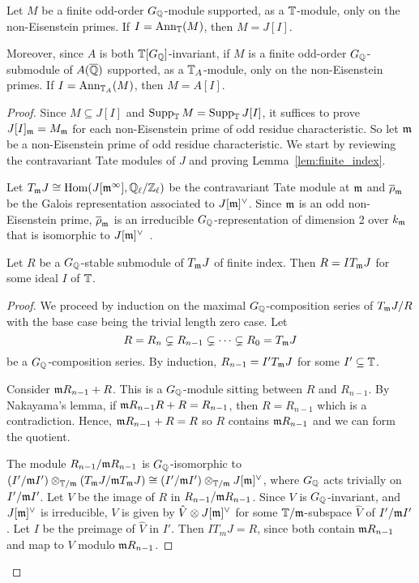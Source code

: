 \documentclass[thesis.tex]{subfiles}
\begin{document}
\begin{theorem}%
    \label{thm:non_eisenstein_kernel_hecke}
    Let $M$ be a finite odd-order $G_{\mathbb{Q}}$-module supported, as a $\mathbb{T}$-module,
    only on the non-Eisenstein primes. If $I=\operatorname{Ann}_{\mathbb{T}}(M)$, then $M=J[I]$.

    Moreover, since $A$ is both $\mathbb{T}[G_{\mathbb{Q}}]$-invariant, if $M$ is a finite
    odd-order $G_{\mathbb{Q}}$-submodule of $A(\overline{\mathbb{Q}})$ supported, as a $\mathbb{T}_A$-module,
    only on the non-Eisenstein primes. If $I=\operatorname{Ann}_{\mathbb{T}_A}(M)$, then $M=A[I]$.
\end{theorem}
\begin{proof}
Since $M\subseteq J[I]$ and $\operatorname{Supp}_{\mathbb{T}} M = \operatorname{Supp}_{\mathbb{T}} J[I]$, it suffices to
prove $J[I]_{\mathfrak{m}} = M_{\mathfrak{m}}$ for each non-Eisenstein prime of odd residue
characteristic. So let $\mathfrak{m}$ be a non-Eisenstein prime of odd residue
characteristic. We start by reviewing the contravariant Tate modules of $J$ and
proving Lemma~\ref{lem:finite_index}.

Let $T_{\mathfrak{m}} J\cong \operatorname{Hom}(J[\mathfrak{m}^\infty], \mathbb{Q}_\ell/\mathbb{Z}_\ell)$ be the contravariant
Tate module at $\mathfrak{m}$ and $\overline{\rho}_{\mathfrak{m}}$ be the Galois representation
associated to $J[\mathfrak{m}]^\vee$. Since $\mathfrak{m}$ is an odd non-Eisenstein prime,
$\overline{\rho}_{\mathfrak{m}}$ is an irreducible $G_{\mathbb{Q}}$-representation of dimension 2
over $k_{\mathfrak{m}}$ that is isomorphic to $J[\mathfrak{m}]^\vee$~\cite[Prop.
14.2]{mazur:eisenstein}.

\begin{lemma}\label{lem:finite_index}
    Let $R$ be a $G_{\mathbb{Q}}$-stable submodule of $T_{\mathfrak{m}} J$ of finite index. Then
    $R=IT_{\mathfrak{m}} J$ for some ideal $I$ of $\mathbb{T}$.
\end{lemma}
\begin{proof}
    We proceed by induction on the maximal $G_{\mathbb{Q}}$-composition series of $T_{\mathfrak{m}} J/R$
    with the base case being the trivial length zero case. Let
    \[
        R = R_n \subsetneq R_{n-1} \subsetneq \cdots \subsetneq R_0 = T_{\mathfrak{m}} J
    \]
    be a $G_{\mathbb{Q}}$-composition series. By induction, $R_{n-1} = I'T_{\mathfrak{m}} J$ for some
    $I'\subseteq \mathbb{T}$.

    Consider $\mathfrak{m} R_{n-1} + R$. This is a $G_{\mathbb{Q}}$-module sitting between $R$ and
    $R_{n-1}$. By Nakayama's lemma, if $\mathfrak{m} R_{n-1} R + R = R_{n-1}$, then
    $R=R_{n-1}$ which is a contradiction. Hence, $\mathfrak{m} R_{n-1}+R=R$ so $R$
    contains $\mathfrak{m} R_{n-1}$ and we can form the quotient.

    The module $R_{n-1}/\mathfrak{m} R_{n-1}$ is $G_{\mathbb{Q}}$-isomorphic to $(I'/\mathfrak{m}
    I')\otimes_{\mathbb{T}/\mathfrak{m}} (T_{\mathfrak{m}} J/\mathfrak{m} T_{\mathfrak{m}} J) \cong (I'/\mathfrak{m} I')\otimes_{\mathbb{T}/\mathfrak{m}}
    J[\mathfrak{m}]^\vee$, where $G_{\mathbb{Q}}$ acts trivially on $I'/\mathfrak{m} I'$. Let $V$ be the image
    of $R$ in $R_{n-1}/\mathfrak{m} R_{n-1}$. Since $V$ is $G_{\mathbb{Q}}$-invariant, and
    $J[\mathfrak{m}]^\vee$ is irreducible, $V$ is given by $\hat{V}\otimes J[\mathfrak{m}]^\vee$
    for some $\mathbb{T}/\mathfrak{m}$-subspace $\hat{V}$ of $I'/\mathfrak{m} I'$. Let $I$ be the preimage
    of $\hat{V}$ in $I'$. Then $IT_m J = R$, since both contain $\mathfrak{m} R_{n-1}$
    and map to $V$ modulo $\mathfrak{m} R_{n-1}$.
\end{proof}



\end{proof}
\end{document}
